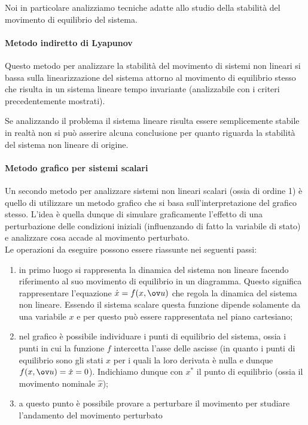 		Noi in particolare analizziamo tecniche adatte allo studio della stabilità del movimento di equilibrio del sistema.
		
		\paragraph{Metodo indiretto di Lyapunov} Questo metodo per analizzare la stabilità del movimento di sistemi non lineari si bassa sulla linearizzazione del sistema attorno al movimento di equilibrio stesso che risulta in un sistema lineare tempo invariante (analizzabile con i criteri precedentemente mostrati).
		
		Se analizzando il problema il sistema lineare risulta essere semplicemente stabile in realtà non si può asserire alcuna conclusione per quanto riguarda la stabilità del sistema non lineare di origine.
		
		\paragraph{Metodo grafico per sistemi scalari} Un secondo metodo per analizzare sistemi non lineari scalari (ossia di ordine 1) è quello di utilizzare un metodo grafico che si basa sull'interpretazione del grafico stesso. L'idea è quella dunque di simulare graficamente l'effetto di una perturbazione delle condizioni iniziali (influenzando di fatto la variabile di stato) e analizzare cosa accade al movimento perturbato. \\
		Le operazioni da eseguire possono essere riassunte nei seguenti passi:
		\begin{enumerate}
			\item in primo luogo si rappresenta la dinamica del sistema non lineare facendo riferimento al suo movimento di equilibrio in un diagramma. Questo significa rappresentare l'equazione $\dot x = f(x,\ov u)$ che regola la dinamica del sistema non lineare. Essendo il sistema scalare questa funzione dipende solamente da una variabile $x$ e per questo può essere rappresentata nel piano cartesiano;
			
			\item nel grafico è possibile individuare i punti di equilibrio del sistema, ossia i punti in cui la funzione $f$ intercetta l'asse delle ascisse (in quanto i punti di equilibrio sono gli stati $x$ per i quali la loro derivata è nulla e dunque $f(x,\ov u)=\dot x = 0$). Indichiamo dunque con $x^*$ il punto di equilibrio (ossia il movimento nominale $\hat x$);
			
			\item a questo punto è possibile provare a perturbare il movimento per studiare l'andamento del movimento perturbato 
		\end{enumerate}
	

